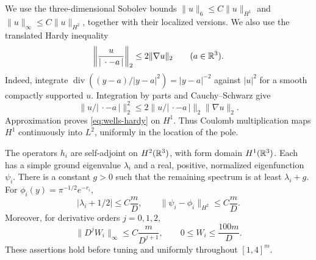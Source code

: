 We use the three-dimensional Sobolev bounds
\(\|u\|_6\le C\|u\|_{H^1}\) and
\(\|u\|_\infty\le C\|u\|_{H^2}\), together with their localized versions.
We also use the translated Hardy inequality
\begin{equation}
 \left\|\frac{u}{|\,\cdot-a\,|}\right\|_2
 \le2\|\nabla u\|_2\qquad(a\in\mathbb R^3).
 \label{eq:wells-hardy}
\end{equation}
Indeed, integrate
\(\operatorname{div}((y-a)/|y-a|^2)=|y-a|^{-2}\)
against \(|u|^2\) for a smooth compactly supported \(u\). Integration by
parts and Cauchy--Schwarz give
\[
 \|u/|\,\cdot-a\,|\|_2^2
 \le2\|u/|\,\cdot-a\,|\|_2\|\nabla u\|_2.
\]
Approximation proves \eqref{eq:wells-hardy} on \(H^1\).
Thus Coulomb multiplication maps \(H^1\) continuously into \(L^2\),
uniformly in the location of the pole.

\begin{proposition}
\label{prop:isolated-well}
The operators \(h_i\) are self-adjoint on \(H^2(\mathbb R^3)\), with form domain
\(H^1(\mathbb R^3)\). Each has a simple ground eigenvalue \(\lambda_i\) and a
real, positive, normalized eigenfunction \(\psi_i\). There is a constant
\(g>0\) such that the remaining spectrum is at least \(\lambda_i+g\).
For \(\phi_i(y)=\pi^{-1/2}e^{-r_i}\),
\begin{equation}
 |\lambda_i+1/2|\le C\frac mD,\qquad
 \|\psi_i-\phi_i\|_{H^2}\le C\frac mD.
 \label{eq:wells-h2}
\end{equation}
Moreover, for derivative orders \(j=0,1,2\),
\begin{equation}
 \|D^jW_i\|_\infty\le C\frac m{D^{j+1}},
 \qquad 0\le W_i\le\frac{100m}{D}.
 \label{eq:wells-field-bounds}
\end{equation}
These assertions hold before tuning and uniformly throughout
\([1,4]^m\).
\end{proposition}

